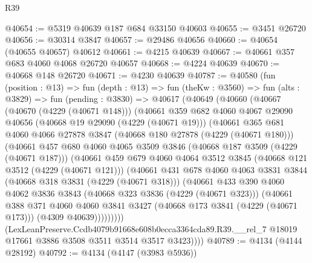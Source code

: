 \begin{lexlean}{R39}
\begin{coremodule}
@40654 := @5319 @40639 @187 @684 @33150 @40603
@40655 := @3451 @26720
@40656 := @30314 @3847
@40657 := @29486 @40656
@40660 := @40654 (@40655 @40657) @40612
@40661 := @4215 @40639
@40667 := @40661 @357 @683 @4060 @4068 @26720 @40657
@40668 := @4224 @40639
@40670 := @40668 @148 @26720
@40671 := @4230 @40639
@40787 := @40580
    (fun (position : @13) =>
    fun (depth : @13) =>
    fun (theKw : @3560) =>
    fun (alts : @3829) =>
    fun (pending : @3830) =>
    @40617
      (@40649
        (@40660
          (@40667
            (@40670 (@4229 (@40671 @148)))
            (@40661
              @359
              @682
              @4060
              @4067
              @29090
              @40656
              (@40668 @19 @29090 (@4229 (@40671 @19)))
              (@40661
                @365
                @681
                @4060
                @4066
                @27878
                @3847
                (@40668 @180 @27878 (@4229 (@40671 @180)))
                (@40661
                  @457
                  @680
                  @4060
                  @4065
                  @3509
                  @3846
                  (@40668 @187 @3509 (@4229 (@40671 @187)))
                  (@40661
                    @459
                    @679
                    @4060
                    @4064
                    @3512
                    @3845
                    (@40668 @121 @3512 (@4229 (@40671 @121)))
                    (@40661
                      @431
                      @678
                      @4060
                      @4063
                      @3831
                      @3844
                      (@40668 @318 @3831 (@4229 (@40671 @318)))
                      (@40661
                        @433
                        @390
                        @4060
                        @4062
                        @3836
                        @3843
                        (@40668 @323 @3836 (@4229 (@40671 @323)))
                        (@40661
                          @388
                          @371
                          @4060
                          @4060
                          @3841
                          @3427
                          (@40668 @173 @3841 (@4229 (@40671 @173)))
                          (@4309 @40639)))))))))
          (LexLeanPreserve.Ccdb4079b91668e608b0ecca3364cda89.R39.__rel_7
            @18019
            @17661
            @3886
            @3508
            @3511
            @3514
            @3517
            @3423))))
@40789 := @4134 (@4144 @28192)
@40792 := @4134 (@4147 (@3983 @5936))

\end{coremodule}
\end{lexlean}
